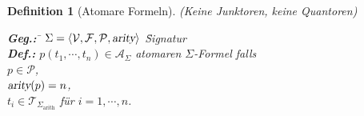 \documentclass{article}
\newtheorem{Definition}{Definition}
\begin{document}
\begin{Definition}[Atomare Formeln] (Keine Junktoren, keine Quantoren)
  \begin{tabbing}
  \qquad \= \textbf{Geg.:} \quad \= $\Sigma = \langle \mathcal{V}, \mathcal{F}, \mathcal{P}, \textsl{arity} \rangle$ \quad \= Signatur \\[0.2cm]
         \> \textbf{Def.:}       \>  $p(t_1,\cdots,t_n) \in \mathcal{A}_\Sigma$ \quad \> atomaren $\Sigma$-Formel falls\\[0.1cm]
         \>                      \>             \> $p \in \mathcal{P}$, \\[0.1cm]
         \>                      \>             \> $\textsl{arity}(p) = n$, \\[0.1cm]
         \>                      \>             \> $t_i \in \mathcal{T}_{\Sigma_{\mathrm{arith}}}$ f\"{u}r $i=1,\cdots,n$. \\[0.1cm]
 \end{tabbing}
\end{Definition}
\end{document}
